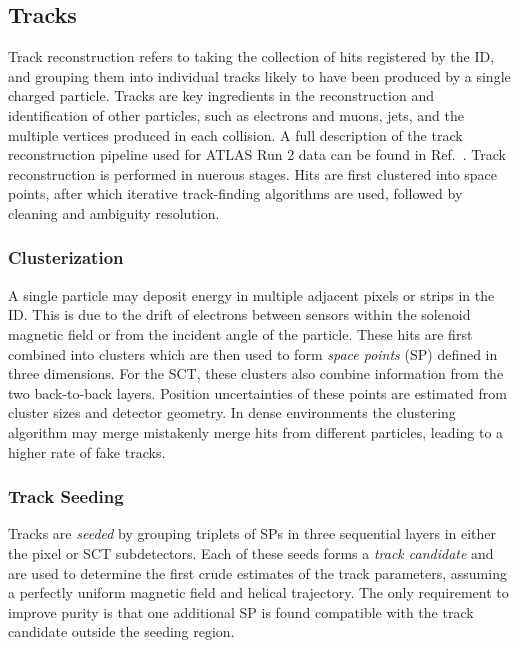 \subsection{Tracks}

Track reconstruction refers to taking the collection of hits registered by the ID, and grouping them into individual tracks likely to have been produced by a single charged particle.
Tracks are key ingredients in the reconstruction and identification of other particles, such as electrons and muons, jets, and the multiple vertices produced in each collision.
A full description of the track reconstruction pipeline used for ATLAS Run 2 data can be found in Ref.~\cite{PerformanceATLASTrack}.
Track reconstruction is performed in nuerous stages.
Hits are first clustered into space points, after which iterative track-finding algorithms are used, followed by cleaning and ambiguity resolution.

\subsubsection{Clusterization}

A single particle may deposit energy in multiple adjacent pixels or strips in the ID\@.
This is due to the drift of electrons between sensors within the solenoid magnetic field or from the incident angle of the particle.
These hits are first combined into clusters which are then used to form \textit{space points} (SP) defined in three dimensions.
For the SCT, these clusters also combine information from the two back-to-back layers.
Position uncertainties of these points are estimated from cluster sizes and detector geometry.
In dense environments the clustering algorithm may merge mistakenly merge hits from different particles, leading to a higher rate of fake tracks.

\subsubsection{Track Seeding}

Tracks are \textit{seeded} by grouping triplets of SPs in three sequential layers in either the pixel or SCT subdetectors.
Each of these seeds forms a \textit{track candidate} and are used to determine the first crude estimates of the track parameters, assuming a perfectly uniform magnetic field and helical trajectory.
The only requirement to improve purity is that one additional SP is found compatible with the track candidate outside the seeding region.

